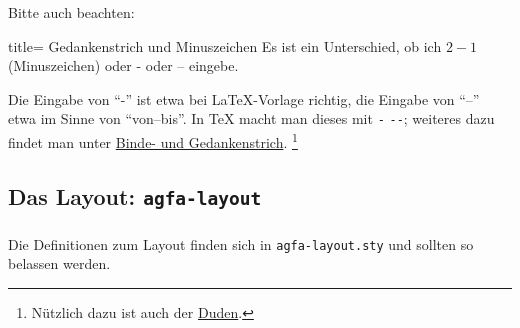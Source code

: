 Bitte auch beachten: 
\begin{tcblisting}{title= Gedankenstrich und Minuszeichen}
Es ist ein Unterschied, ob ich $ 2 - 1 $ (Minuszeichen) oder - oder -- eingebe.
\end{tcblisting}
Die Eingabe von \enquote{-} ist etwa bei \LaTeX{}-Vorlage richtig, die Eingabe von \enquote{--} etwa im Sinne von \enquote{von--bis}.
In \TeX{} macht man dieses mit \verb+-+ \bzw \verb+--+; weiteres dazu findet man unter \href{https://typefacts.com/artikel/binde-und-gedankenstrich}{Binde- und Gedankenstrich}.%
\footnote{Nützlich dazu ist auch der \href{https://de.wikipedia.org/wiki/Duden}{Duden}.}
%
\subsection{Das Layout: \texttt{agfa-layout}}\label{subsec:agfa-layout}
\subsubsection{}
Die Definitionen zum Layout finden sich in \texttt{agfa-layout.sty} und sollten so belassen werden.

